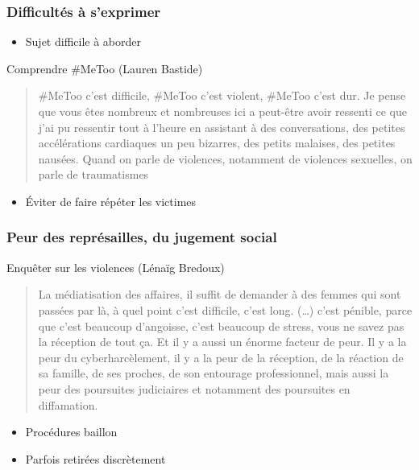 \documentclass[french]{beamer}
\begin{document}
\begin{frame}
  \frametitle{Difficultés à s’exprimer}
  \begin{itemize}
    \item Sujet difficile à aborder
  \end{itemize}
  \begin{block}{Comprendre \#MeToo (Lauren Bastide)}
    \begin{quote}
      \#MeToo c’est difficile, \#MeToo c’est violent, \#MeToo c’est dur. Je pense que vous êtes nombreux et nombreuses ici a peut-être avoir ressenti ce que j’ai pu ressentir tout à l’heure en assistant à des conversations, des petites accélérations cardiaques un peu bizarres, des petits malaises, des petites nausées. Quand on parle de violences, notamment de violences sexuelles, on parle de traumatismes
    \end{quote}
  \end{block}
  \begin{itemize}
    \item Éviter de faire répéter les victimes
  \end{itemize}
\end{frame}

\begin{frame}
  \frametitle{Peur des représailles, du jugement social}
  \begin{block}{Enquêter sur les violences (Lénaïg Bredoux)}
    \begin{quote}
      La médiatisation des affaires, il suffit de demander à des femmes qui sont passées par là, à quel point c’est difficile, c’est long. (…) c’est pénible, parce que c’est beaucoup d’angoisse, c’est beaucoup de stress, vous ne savez pas la réception de tout ça. Et il y a aussi un énorme facteur de peur. Il y a la peur du cyberharcèlement, il y a la peur de la réception, de la réaction de sa famille, de ses proches, de son entourage professionnel, mais aussi la peur des poursuites judiciaires et notamment des poursuites en diffamation.
    \end{quote}
  \end{block}
  \begin{itemize}
    \item Procédures \og{}baillon\fg{}
    \item Parfois retirées discrètement
  \end{itemize}
\end{frame}
\end{document}
